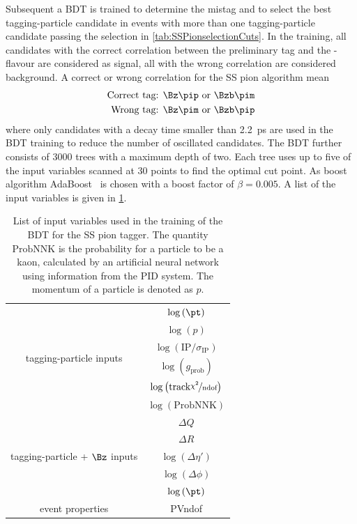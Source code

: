 Subsequent a BDT is trained to determine the mistag and to select the best tagging-particle candidate in events with more than one tagging-particle candidate passing  the selection in \cref{tab:SSPionselectionCuts}.
In the training, all candidates with the correct correlation between the preliminary tag and the \B-flavour are considered as signal, all with the wrong correlation are considered background.
A correct or wrong correlation for the SS pion algorithm mean
\begin{align*}
	\text{Correct tag: }& \Bz\pip \text{ or } \Bzb\pim\\
	\text{Wrong tag: }& \Bz\pim \text{ or } \Bzb\pip
\end{align*}
where only \B candidates with a decay time smaller than \SI{2.2}{\pico\second} are used in the BDT training to reduce the number of oscillated \B candidates.
The BDT further consists of \num{3000} trees with a maximum depth of two.
Each tree uses up to five of the input variables scanned at 30 points to find the optimal cut point.
As boost algorithm AdaBoost~\cite{AdaBoost} is chosen with a boost factor of $\beta=0.005$.
A list of the input variables is given in \cref{tab:BDTInputSSPion}.
\begin{table}[tbp]
	\centering
	\caption{List of input variables used in the training of the BDT for the SS pion tagger.
	The quantity $\mathrm{ProbNNK}$ is the probability for a particle to be a kaon, calculated by an artificial neural network using information from the \lhcb PID system.
	The momentum of a particle is denoted as $p$.}
	\begin{tabular}{cc}
		\toprule
		\multirow{6}{*}{tagging-particle inputs} 	& $\log\left(\pt\right)$ \\
													& $\log\left(p\right)$ \\
													& $\log\left(\text{IP}/\sigma_\text{IP}\right)$\\
													& $\log\left(g_\text{prob}\right)$\\
													& $\log\left(\text{track} \nicefrac{\chi^2}{\text{ndof}}\right)$ \\
													& $\log\left(\text{ProbNNK}\right)$\\
		\midrule
		\multirow{5}{*}{tagging-particle + $\Bz$ inputs}	& $\Delta Q$\\
															& $\Delta R$\\
															& $\log\left(\Delta\eta'\right)$\\
															& $\log\left(\Delta\phi\right)$\\
															& $\log\left(\pt\right)$\\
		\midrule
		\multirow{1}{*}{event properties}	& PVndof\\
		\bottomrule
	\end{tabular}
	\label{tab:BDTInputSSPion}
\end{table}
